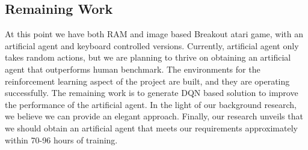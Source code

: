 \subsection{Remaining Work}
At this point we have both RAM and image based Breakout atari game, with an artificial agent and keyboard controlled versions. Currently, artificial agent only takes random actions, but we are planning to thrive on obtaining an artificial agent that outperforms human benchmark. The environments for the reinforcement learning aspect of the project are built, and they are operating successfully. The remaining work is to generate DQN based solution to improve the performance of the artificial agent. In the light of our background research, we believe we can provide an elegant approach. Finally, our research unveils that we should obtain an artificial agent that meets our requirements approximately within 70-96 hours of training.